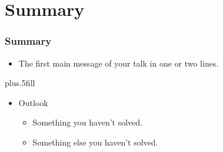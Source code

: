 \documentclass{beamer}
\begin{document}
\section*{Summary}

\begin{frame}
\frametitle<presentation>{Summary}

\begin{itemize}
  \item The \alert{first main message} of your talk in one or two lines.
\end{itemize}

\vskip0pt plus.5fill
\begin{itemize}
  \item Outlook
  \begin{itemize}
    \item Something you haven't solved.
    \item Something else you haven't solved.
  \end{itemize}
\end{itemize}
\end{frame}
\end{document}
